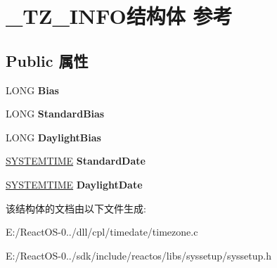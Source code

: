 \hypertarget{struct___t_z___i_n_f_o}{}\section{\+\_\+\+T\+Z\+\_\+\+I\+N\+F\+O结构体 参考}
\label{struct___t_z___i_n_f_o}
\subsection*{Public 属性}
\begin{DoxyCompactItemize}
\item 
\mbox{\label{struct___t_z___i_n_f_o_aab023c58731d006aa19fd639bda8cb55}} 
L\+O\+NG {\bfseries Bias}
\item 
\mbox{\label{struct___t_z___i_n_f_o_aa66d238b63a92369707cd1232ea0a0d7}} 
L\+O\+NG {\bfseries Standard\+Bias}
\item 
\mbox{\label{struct___t_z___i_n_f_o_a5a758e9d46287f502452ec503ec17267}} 
L\+O\+NG {\bfseries Daylight\+Bias}
\item 
\mbox{\label{struct___t_z___i_n_f_o_a8fc331b8e3cfd523b5bf351653a188b9}} 
\hyperlink{struct___s_y_s_t_e_m_t_i_m_e}{S\+Y\+S\+T\+E\+M\+T\+I\+ME} {\bfseries Standard\+Date}
\item 
\mbox{\label{struct___t_z___i_n_f_o_a2c3faecb54317ef6c57a10a8a43ed471}} 
\hyperlink{struct___s_y_s_t_e_m_t_i_m_e}{S\+Y\+S\+T\+E\+M\+T\+I\+ME} {\bfseries Daylight\+Date}
\end{DoxyCompactItemize}


该结构体的文档由以下文件生成\+:\begin{DoxyCompactItemize}
\item 
E\+:/\+React\+O\+S-\/0../dll/cpl/timedate/timezone.\+c\item 
E\+:/\+React\+O\+S-\/0../sdk/include/reactos/libs/syssetup/syssetup.\+h\end{DoxyCompactItemize}

